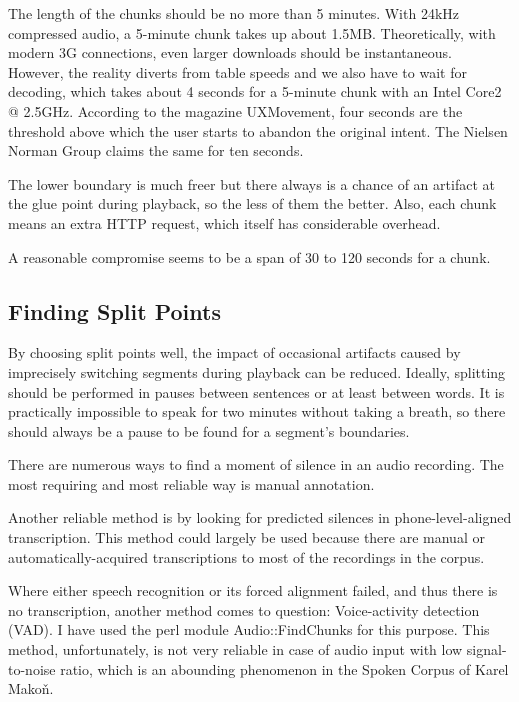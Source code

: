 \documentclass{llncs}
\begin{document}
The length of the chunks should be no more than 5 minutes. With 24kHz
compressed audio, a 5-minute chunk takes up about 1.5MB. Theoretically, with
modern 3G connections, even larger downloads should be instantaneous. However,
the reality diverts from table speeds and we also have to wait for decoding,
which takes about 4 seconds for a 5-minute chunk with an Intel Core2 @ 2.5GHz.
According to the magazine UXMovement\cite{foursecondrule}, four seconds are the
threshold above which the user starts to abandon the original intent. The Nielsen
Norman Group\cite{websiteresponsetimes} claims the same for ten seconds.

The lower boundary is much freer but there always is a chance of an artifact at
the glue point during playback, so the less of them the better. Also, each chunk
means an extra HTTP request, which itself has considerable overhead.

A reasonable compromise seems to be a span of 30 to 120 seconds for a chunk.

\subsection{Finding Split Points}

By choosing split points well, the impact of occasional artifacts caused by
imprecisely switching segments during playback can be reduced. Ideally,
splitting should be performed in pauses between sentences or at least between
words. It is practically impossible to speak for two minutes without taking a
breath, so there should always be a pause to be found for a segment's
boundaries.

There are numerous ways to find a moment of silence in an audio recording. The
most requiring and most reliable way is manual annotation.

Another reliable method is by looking for predicted silences in
phone-level-aligned transcription. This method could largely be used because there are
manual or automatically-acquired transcriptions to most of the recordings in the
corpus.

Where either speech recognition or its forced alignment failed, and thus there
is no transcription, another method comes to question: Voice-activity detection
(VAD).  I have used the perl module Audio::FindChunks for this purpose. This
method, unfortunately, is not very reliable in case of audio input with low
signal-to-noise ratio, which is an abounding phenomenon in the Spoken Corpus of
Karel Makoň.
\end{document}
